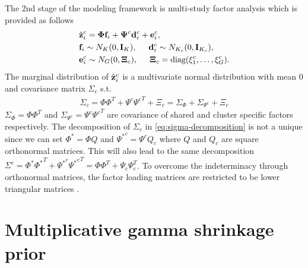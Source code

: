 \documentclass[
]{book}
\begin{document}
The 2nd stage of the modeling framework is multi-study factor analysis \citep{de2018bayesian} which is provided as follows
\begin{align}
\begin{split}
& \hat{\bf z}^{c}_{i} = \boldsymbol \Phi {\bf f}_{i} + \boldsymbol \Psi^{c} {\bf d}^{c}_{i} + {\bf e}^{c}_{i}, \\
& {\bf f}_{i} \sim N_{K}(0, {\bf I}_{K}), \hspace{0.5cm} {\bf d}^{c}_{i} \sim N_{K_{c}}(0,{\bf I}_{K_{c}}),\\
& {\bf e}^{c}_{i} \sim N_{G}(0,\boldsymbol \Xi_{c}), \hspace{0.5cm} \boldsymbol \Xi_{c} = \text{diag}(\xi^{c}_{1}, \dots, \xi^{c}_{G} ).
\end{split}
\label{eq:MSFA-supp}
\end{align}
The marginal distribution of \(\hat{\bf z}^{c}_{i}\) is a multivariate normal distribution with mean \(0\) and covariance matrix \(\Sigma_{c}\) s.t.
\begin{align}
\Sigma_{c} = \Phi \Phi^{T} + \Psi^{c} {\Psi^{c}}^{T} + \Xi_{c} = \Sigma_{\Phi} + \Sigma_{\Psi^{c}} + \Xi_{c}
\label{eq:sigma-decomposition}
\end{align}
\(\Sigma_{\Phi} = \Phi \Phi^{T}\) and \(\Sigma_{\Psi^{c}} = \Psi^{c} {\Psi^{c}}^{T}\) are covariance of shared and cluster specific factors respectively. The decomposition of \(\Sigma_{c}\) in \eqref{eq:sigma-decomposition} is not a unique since we can set \(\Phi^{*} = \Phi Q\) and \({\Psi^{*}}^{c} = \Psi^{c} Q_{c}\) where \(Q\) and \(Q_{c}\) are square orthonormal matrices. This will also lead to the same decomposition \(\Sigma^{c} = \Phi^{*} {\Phi^{*}}^{T} + {\Psi^{*}}^{c} {{\Psi^{*}}^{c}}^{T} = \Phi \Phi^{T} + \Psi_{c} \Psi_{c}^{T}\). To overcome the indeterminacy through orthonormal matrices, the factor loading matrices are restricted to be lower triangular matrices \citep{geweke1996measuring, lopes2004bayesian}.

\hypertarget{multiplicative-gamma-shrinkage-prior}{%
\section{Multiplicative gamma shrinkage prior}\label{multiplicative-gamma-shrinkage-prior}}
\end{document}
